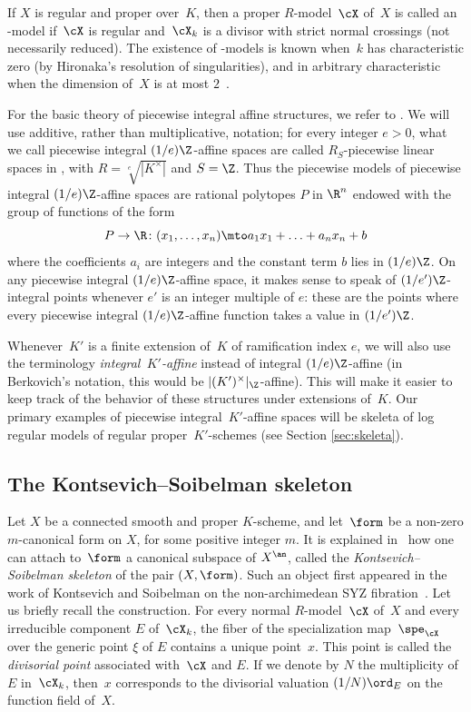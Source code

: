 If $X$ is regular and proper over~$K$, then a proper $R$\nobreakdash-model~$\cX$ of~$X$ is called an \snc-model if~$\cX$ is regular and~$\cX_k$ is a divisor with strict normal crossings (not necessarily reduced). The existence of \snc-models is known when~$k$ has characteristic zero (by Hironaka's resolution of singularities), and in arbitrary characteristic when the dimension of~$X$ is at most $2$~\cite{CJS, cossart-piltant}.

For the basic theory of piecewise integral affine structures, we refer to
\cite[\S1]{BerkContractII}. We will use additive, rather than multiplicative, notation;
for every integer $e>0$,
what we call piecewise integral $(1/e)\Z$-affine spaces are called $R_S$-piecewise linear spaces in \cite[\S1]{BerkContractII}, with $R=\sqrt[e]{|K^{\times}|}$ and
$S=\Z$. Thus the piecewise models of
piecewise integral $(1/e)\Z$-affine spaces are rational polytopes $P$ in $\R^n$ endowed with the group of functions of the form
\[
P\to \R\colon (x_1,\ldots,x_n)\mto a_1x_1+\ldots+a_nx_n+b
\]
where the coefficients $a_i$ are integers and the constant term $b$ lies in $(1/e)\Z$.
On any piecewise integral $(1/e)\Z$-affine space, it makes sense to speak of $(1/e')\Z$-integral points whenever $e'$ is an integer multiple of $e$: these are the points where every piecewise integral $(1/e)\Z$-affine function takes a value in $(1/e')\Z$.

Whenever~$K'$ is a finite extension of~$K$ of ramification index $e$, we will also use the terminology {\em integral~$K'$-affine}
instead of integral $(1/e)\Z$-affine (in Berkovich's notation, this would be $|(K')^{\times}|_{\Z}$-affine).
This will make it easier to keep track of the behavior of these structures under extensions of~$K$. Our primary examples of
piecewise integral~$K'$-affine spaces will be skeleta of log regular models of regular proper~$K'$-schemes (see Section \ref{sec:skeleta}).

\subsection{The Kontsevich--Soibelman skeleton}\label{ss:KS}
Let $X$ be a connected smooth and proper $K$\nobreakdash-scheme, and let~$\form$ be a non-zero $m$-canonical form on $X$, for some positive integer $m$.
It is explained in~\cite{MuNi} how one can attach to~$\form$ a canonical subspace of $X^{\an}$, called the {\em Kontsevich--Soibelman skeleton} of the pair $(X,\form)$.
Such an object first appeared in the work of Kontsevich and Soibelman on the non-archimedean SYZ fibration~\cite{KS}. Let us briefly recall the construction. For every normal $R$\nobreakdash-model~$\cX$ of~$X$ and every irreducible component $E$ of~$\cX_k$, the fiber of the specialization map~$\spe_{\cX}$ over the generic point $\xi$ of $E$ contains a unique point~$x$. This point is called the {\em divisorial point} associated with~$\cX$ and $E$. If we denote by $N$ the multiplicity of $E$ in~$\cX_k$, then~$x$ corresponds to the divisorial valuation $(1/N)\ord_E$ on the function field of~$X$.

